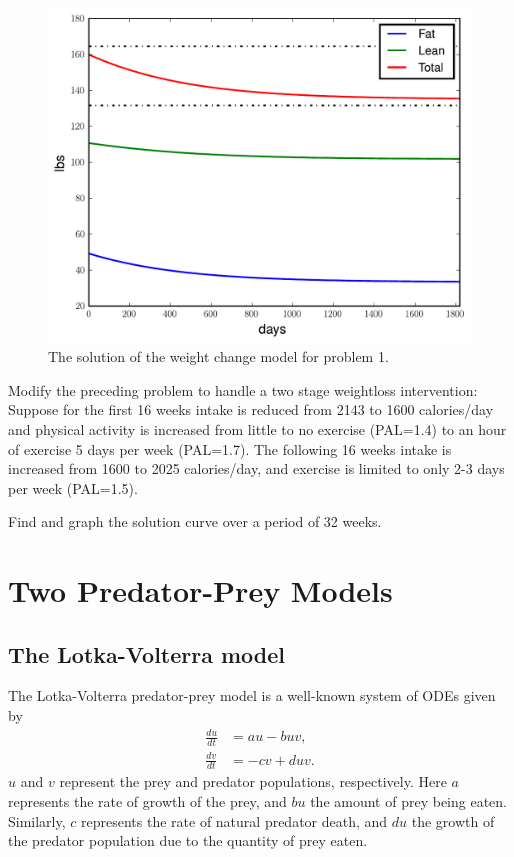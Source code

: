 \begin{figure}
\centering
\includegraphics[width=\textwidth]{weightloss.pdf}
\caption{The solution of the weight change model for problem 1.}
\label{fig:weightloss}
\end{figure}

\begin{problem}
Modify the preceding problem to handle a two stage weightloss intervention:
Suppose for the first 16 weeks intake is reduced from 2143 to 1600 calories/day and physical activity is increased from little to no exercise (PAL=1.4) to an hour of exercise 5 days per week (PAL=1.7).
The following 16 weeks intake is increased from 1600 to 2025 calories/day, and exercise is limited to only 2-3 days per week (PAL=1.5).

Find and graph the solution curve over a period of 32 weeks.
\end{problem}

\section*{Two Predator-Prey Models}
\subsection*{The Lotka-Volterra model}
The Lotka-Volterra predator-prey model is a well-known
system of ODEs given by
\begin{align*}
	\frac{du}{dt} &= au - buv,\\
	\frac{dv}{dt} &= -cv + duv.
\end{align*}
$u$ and $v$ represent the prey and predator populations, respectively. Here $a$ represents the rate of growth of the prey, and $bu$ the amount of prey being eaten.
Similarly, $c$ represents the rate of natural predator death, and $du$ the growth of the predator population due to the quantity of prey eaten.

